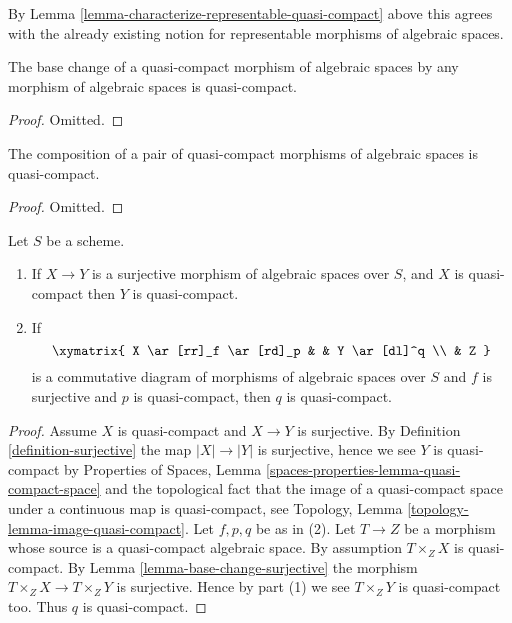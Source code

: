 \noindent
By Lemma \ref{lemma-characterize-representable-quasi-compact}
above this agrees with the already existing notion
for representable morphisms of algebraic spaces.

\begin{lemma}
\label{lemma-base-change-quasi-compact}
The base change of a quasi-compact morphism of algebraic spaces
by any morphism of algebraic spaces is quasi-compact.
\end{lemma}

\begin{proof}
Omitted.
\end{proof}

\begin{lemma}
\label{lemma-composition-quasi-compact}
The composition of a pair of quasi-compact morphisms of algebraic spaces
is quasi-compact.
\end{lemma}

\begin{proof}
Omitted.
\end{proof}

\begin{lemma}
\label{lemma-surjection-from-quasi-compact}
Let $S$ be a scheme.
\begin{enumerate}
\item If $X \to Y$ is a surjective morphism of algebraic spaces over $S$,
and $X$ is quasi-compact then $Y$ is quasi-compact.
\item If
$$
\xymatrix{
X \ar[rr]_f \ar[rd]_p & &
Y \ar[dl]^q \\
& Z
}
$$
is a commutative diagram of morphisms of algebraic spaces over $S$
and $f$ is surjective and $p$ is quasi-compact, then $q$ is quasi-compact.
\end{enumerate}
\end{lemma}

\begin{proof}
Assume $X$ is quasi-compact and $X \to Y$ is surjective. By
Definition \ref{definition-surjective}
the map $|X| \to |Y|$ is surjective, hence we see $Y$ is quasi-compact by
Properties of Spaces, Lemma \ref{spaces-properties-lemma-quasi-compact-space}
and the topological fact that the image of a quasi-compact space under a
continuous map is quasi-compact, see
Topology, Lemma \ref{topology-lemma-image-quasi-compact}.
Let $f, p, q$ be as in (2).
Let $T \to Z$ be a morphism whose source is a quasi-compact algebraic space.
By assumption $T \times_Z X$ is quasi-compact. By
Lemma \ref{lemma-base-change-surjective}
the morphism $T \times_Z X \to T \times_Z Y$ is surjective.
Hence by part (1) we see $T \times_Z Y$ is quasi-compact too.
Thus $q$ is quasi-compact.
\end{proof}

